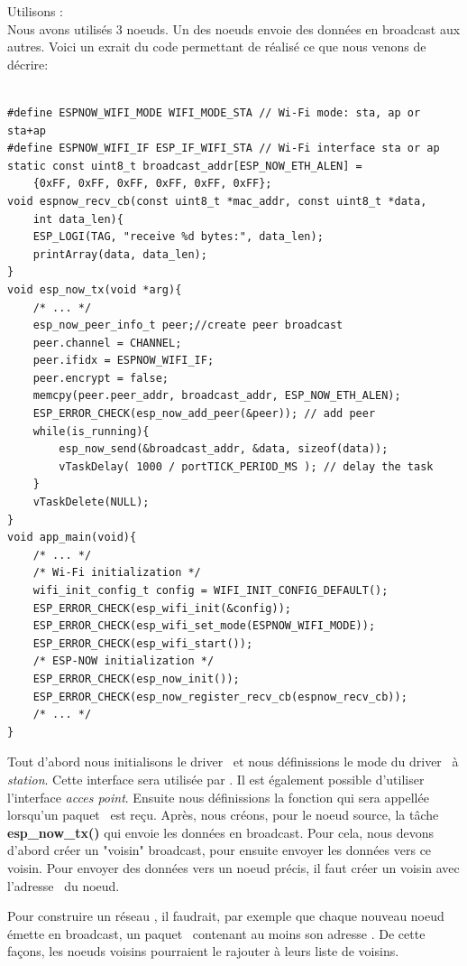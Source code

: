         Utilisons \espnow:\\
        Nous avons utilisés 3 noeuds. Un des noeuds envoie des données en broadcast aux autres.
        Voici un exrait du code permettant de réalisé ce que nous venons de décrire:
        \begin{verbatim}

#define ESPNOW_WIFI_MODE WIFI_MODE_STA // Wi-Fi mode: sta, ap or sta+ap
#define ESPNOW_WIFI_IF ESP_IF_WIFI_STA // Wi-Fi interface sta or ap
static const uint8_t broadcast_addr[ESP_NOW_ETH_ALEN] = 
    {0xFF, 0xFF, 0xFF, 0xFF, 0xFF, 0xFF};
void espnow_recv_cb(const uint8_t *mac_addr, const uint8_t *data,
    int data_len){
    ESP_LOGI(TAG, "receive %d bytes:", data_len);
    printArray(data, data_len);
}
void esp_now_tx(void *arg){
    /* ... */
    esp_now_peer_info_t peer;//create peer broadcast
    peer.channel = CHANNEL;
    peer.ifidx = ESPNOW_WIFI_IF;
    peer.encrypt = false;
    memcpy(peer.peer_addr, broadcast_addr, ESP_NOW_ETH_ALEN);
    ESP_ERROR_CHECK(esp_now_add_peer(&peer)); // add peer
    while(is_running){
        esp_now_send(&broadcast_addr, &data, sizeof(data));
        vTaskDelay( 1000 / portTICK_PERIOD_MS ); // delay the task
    }
    vTaskDelete(NULL); 
}
void app_main(void){    
    /* ... */
    /* Wi-Fi initialization */
    wifi_init_config_t config = WIFI_INIT_CONFIG_DEFAULT();
    ESP_ERROR_CHECK(esp_wifi_init(&config));
    ESP_ERROR_CHECK(esp_wifi_set_mode(ESPNOW_WIFI_MODE));
    ESP_ERROR_CHECK(esp_wifi_start());
    /* ESP-NOW initialization */
    ESP_ERROR_CHECK(esp_now_init());
    ESP_ERROR_CHECK(esp_now_register_recv_cb(espnow_recv_cb));
    /* ... */
}
        \end{verbatim}
Tout d'abord nous initialisons le driver \wifi\ et nous définissions le mode du driver \wifi\ à
\textit{station}. Cette interface sera utilisée par \espnow. Il est également possible d'utiliser 
l'interface \textit{acces point}. 
Ensuite nous définissions la fonction qui sera appellée lorsqu'un paquet \espnow\ est reçu.
Après, nous créons, pour le noeud source, la tâche \textbf{esp\_now\_tx()} qui envoie les données en broadcast.
Pour cela, nous devons d'abord créer un "voisin" broadcast, pour ensuite envoyer les données vers ce voisin.
Pour envoyer des données vers un noeud précis, il faut créer un voisin avec l'adresse \mac\ du noeud.

Pour construire un réseau \mesh, il faudrait, par exemple que chaque nouveau noeud émette en broadcast, un paquet \espnow\ 
contenant au moins son adresse \mac. De cette façons, les noeuds voisins pourraient le rajouter à leurs
liste de voisins.